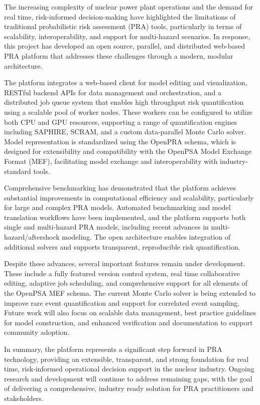 \begin{executivesummary}
The increasing complexity of nuclear power plant operations and the demand for real time, risk-informed decision-making have highlighted the limitations of traditional probabilistic risk assessment (PRA) tools, particularly in terms of scalability, interoperability, and support for multi-hazard scenarios. In response, this project has developed an open source, parallel, and distributed web-based PRA platform that addresses these challenges through a modern, modular architecture.

The platform integrates a web-based client for model editing and visualization, RESTful backend APIs for data management and orchestration, and a distributed job queue system that enables high throughput risk quantification using a scalable pool of worker nodes. These workers can be configured to utilize both CPU and GPU resources, supporting a range of quantification engines including SAPHIRE, SCRAM, and a custom data-parallel Monte Carlo solver. Model representation is standardized using the OpenPRA schema, which is designed for extensibility and compatibility with the OpenPSA Model Exchange Format (MEF), facilitating model exchange and interoperability with industry-standard tools.

Comprehensive benchmarking has demonstrated that the platform achieves substantial improvements in computational efficiency and scalability, particularly for large and complex PRA models. Automated benchmarking and model translation workflows have been implemented, and the platform supports both single and multi-hazard PRA models, including recent advances in multi-hazard/aftershock modeling. The open architecture enables integration of additional solvers and supports transparent, reproducible risk quantification.

Despite these advances, several important features remain under development. These include a fully featured version control system, real time collaborative editing, adaptive job scheduling, and comprehensive support for all elements of the OpenPSA MEF schema. The current Monte Carlo solver is being extended to improve rare event quantification and support for correlated event sampling. Future work will also focus on scalable data management, best practice guidelines for model construction, and enhanced verification and documentation to support community adoption.

In summary, the platform represents a significant step forward in PRA technology, providing an extensible, transparent, and strong foundation for real time, risk-informed operational decision support in the nuclear industry. Ongoing research and development will continue to address remaining gaps, with the goal of delivering a comprehensive, industry ready solution for PRA practitioners and stakeholders.
\end{executivesummary}

